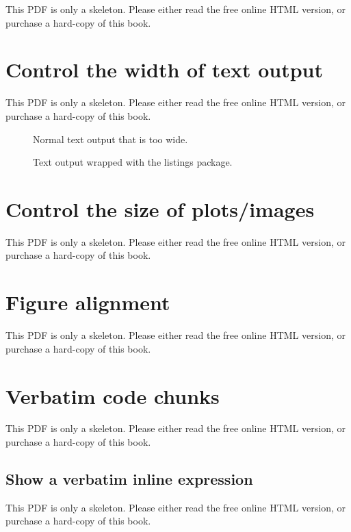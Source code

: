 \documentclass[
  11pt,
]{krantz}
\begin{document}
This PDF is only a skeleton. Please either read the free online HTML version, or purchase a hard-copy of this book.

\section{Control the width of text output}\label{text-width}

This PDF is only a skeleton. Please either read the free online HTML version, or purchase a hard-copy of this book.

\begin{figure}\caption{Normal text output that is too wide.}\end{figure}

\begin{figure}\caption{Text output wrapped with the listings package.}\end{figure}

\section{Control the size of plots/images}\label{figure-size}

This PDF is only a skeleton. Please either read the free online HTML version, or purchase a hard-copy of this book.

\section{Figure alignment}\label{fig-align}

This PDF is only a skeleton. Please either read the free online HTML version, or purchase a hard-copy of this book.

\section{Verbatim code chunks}\label{verbatim-code-chunks}

This PDF is only a skeleton. Please either read the free online HTML version, or purchase a hard-copy of this book.

\subsection{Show a verbatim inline expression}\label{show-a-verbatim-inline-expression}

This PDF is only a skeleton. Please either read the free online HTML version, or purchase a hard-copy of this book.
\end{document}
